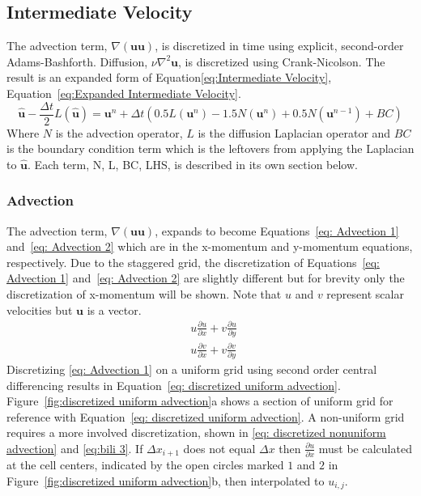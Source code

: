 \subsection{Intermediate Velocity}
\label{sec:ID NS intermediate velocity}

The advection term, $\nabla (\textbf{uu})$, is discretized in time using explicit, second-order Adams-Bashforth. 
Diffusion, $\nu \nabla^2 \textbf{u}$, is discretized using Crank-Nicolson. 
The result is an expanded form of Equation\eqref{eq:Intermediate Velocity}, Equation~\eqref{eq:Expanded Intermediate Velocity}. 
\begin{equation}
\label{eq:Expanded Intermediate Velocity}
\hat{\textbf{u}} - \frac{\Delta t}{2}L(\hat{\textbf{u}}) = \textbf{u}^n + \Delta t\left(0.5L(\textbf{u}^n) - 1.5N(\textbf{u}^n) + 0.5N(\textbf{u}^{n-1}) + BC\right)
\end{equation}
Where $N$ is the advection operator, $L$ is the diffusion Laplacian operator and $BC$ is the boundary condition term which is the leftovers from applying the Laplacian to $\hat{\textbf{u}}$. 
Each term, N, L, BC, LHS, is described in its own section below. 

\subsubsection{Advection}
\label{sed:ID NS Advection}
The advection term, $\nabla (\textbf{uu})$, expands to become Equations~\eqref{eq: Advection 1} and~\eqref{eq: Advection 2} which are in the x-momentum and y-momentum equations, respectively. 
Due to the staggered grid, the discretization of Equations~\eqref{eq: Advection 1} and~\eqref{eq: Advection 2} are slightly different but for brevity only the discretization of x-momentum will be shown. 
Note that $u$ and $v$ represent scalar velocities but $\textbf{u}$ is a vector. 
\begin{align}
&u\frac{\partial u}{\partial x} + v\frac{\partial u}{\partial y} \label{eq: Advection 1} \\ 
&u\frac{\partial v}{\partial x} + v\frac{\partial v}{\partial y} \; \label{eq: Advection 2}
\end{align}
Discretizing \eqref{eq: Advection 1} on a uniform grid using second order central differencing results in Equation~\eqref{eq: discretized uniform advection}. 
Figure~\ref{fig:discretized uniform advection}a shows a section of uniform grid for reference with Equation~\eqref{eq: discretized uniform advection}. 
A non-uniform grid requires a more involved discretization, shown in \eqref{eq: discretized nonuniform advection} and \eqref{eq:bili 3}. 
If $\Delta x_{i+1}$ does not equal $\Delta x$ then $\frac{\partial u}{\partial x}$ must be calculated at the cell centers, indicated by the open circles marked $1$ and $2$ in Figure~\ref{fig:discretized uniform advection}b, then interpolated to $u_{i,j}$. 


